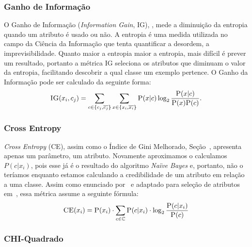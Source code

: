 \subsubsection{Ganho de Informação}
\label{subsubsection::ig}

O Ganho de Informação (\textit{Information Gain}, IG), \cite{Yang97}, mede a diminuição da entropia quando um atributo é usado ou não. A entropia é uma medida utilizada no campo da Ciência da Informação que tenta quantificar a desordem, a imprevisibilidade. Quanto maior a entropia maior a entropia, mais difícil é prever um resultado, portanto a métrica IG seleciona os atributos que diminuam o valor da entropia, facilitando descobrir a qual classe um exemplo pertence. O Ganho da Informação pode ser calculado da seguinte forma:
\begin{equation}\label{eqn::ig}
 \textsc{IG}(x_i, c_j) = \sum_{c \in \{c_j, \overline{c_j}\}}\sum_{x \in \{x_i, \overline{x_i}\}} \textsc{P}(x|c)\log_2\frac{\textsc{P}(x|c)}{ \textsc{P}(x)\textsc{P}(c)}.
\end{equation}

\subsubsection{Cross Entropy}
\label{subsubsection::}

\textit{Cross Entropy} (CE), assim como o Índice de Gini Melhorado, Seção~\cite{subsubsection::gini}, apresenta apenas um parâmetro, um atributo. Novamente aproximamos o calculamos $P(c|x_i)$, pois esse já é o resultado do algoritmo \textit{Naïve Bayes} e, portanto, não o teríamos enquanto estamos calculando a credibilidade de um atributo em relação a uma classe. Assim como enunciado por~\cite{Koller97} e adaptado para seleção de atributos em~\cite{Mladenic98}, essa métrica assume a seguinte fórmula:
\begin{equation}\label{eqn::ce}
 \textsc{CE}(x_i) =  \textsc{P}(x_i) \cdot \sum_{c \in \mathbb{C}} \textsc{P}(c|x_i) \cdot \log_2 \frac{ \textsc{P}(c|x_i) } {\textsc{P}(c) }
\end{equation}

\subsubsection{CHI-Quadrado}
\label{subsubsection::chi}

